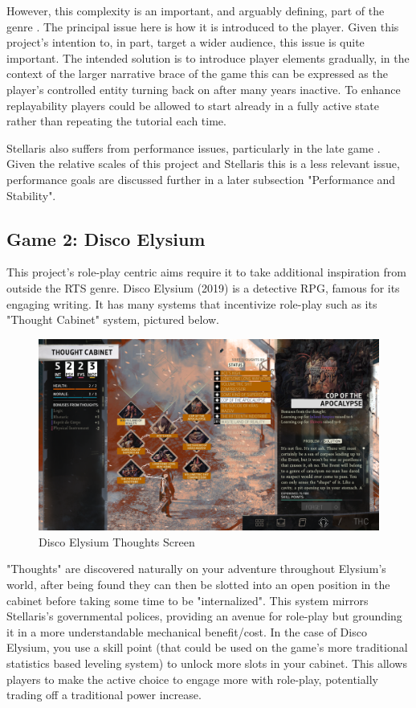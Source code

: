 \documentclass{report}
\begin{document}
However, this complexity is an important, and arguably defining, part of the genre \cite{rtsUncertainty}. The principal issue here is how it is introduced to the player. Given this project's intention to, in part, target a wider audience, this issue is quite important. The intended solution is to introduce player elements gradually, in the context of the larger narrative brace of the game this can be expressed as the player's controlled entity turning back on after many years inactive. To enhance replayability players could be allowed to start already in a fully active state rather than repeating the tutorial each time.

Stellaris also suffers from performance issues, particularly in the late game \cite{stellarisPerformanceReview1} \cite{stellarisPerformanceReview2}. Given the relative scales of this project and Stellaris this is a less relevant issue, performance goals are discussed further in a later subsection "Performance and Stability".
\pagebreak
\subsection{Game 2: Disco Elysium}

This project's role-play centric aims require it to take additional inspiration from outside the RTS genre. Disco Elysium (2019) is a detective RPG, famous for its engaging writing. It has many systems that incentivize  role-play such as its "Thought Cabinet" system, pictured below.

\begin{figure}[H]
    \includegraphics[width=\textwidth]{disco_elysium_thoughts_screen.png}
    \caption{Disco Elysium Thoughts Screen}
\end{figure}

"Thoughts" are discovered naturally on your adventure throughout Elysium's world, after being found they can then be slotted into an open position in the cabinet before taking some time to be "internalized". This system mirrors Stellaris's governmental polices, providing an avenue for role-play but grounding it in a more understandable mechanical benefit/cost. In the case of Disco Elysium, you use a skill point (that could be used on the game's more traditional statistics based leveling system) to unlock more slots in your cabinet. This allows players to make the active choice to engage more with role-play, potentially trading off a traditional power increase.
\end{document}
